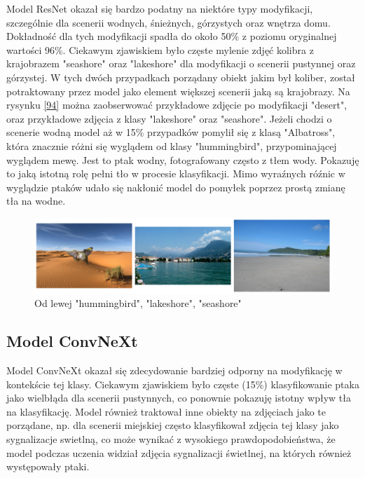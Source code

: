 Model ResNet okazał się bardzo podatny na niektóre typy modyfikacji, szczególnie dla scenerii wodnych, śnieżnych, górzystych oraz wnętrza domu. Dokładność dla tych modyfikacji spadła do około 50\% z poziomu oryginalnej wartości 96\%. Ciekawym zjawiskiem było częste mylenie zdjęć kolibra z krajobrazem "seashore" oraz
"lakeshore" dla modyfikacji o scenerii pustynnej oraz górzystej. W tych dwóch przypadkach porządany obiekt jakim był koliber, został potraktowany przez model jako element większej scenerii jaką są krajobrazy. Na rysynku \ref*{94} można zaobserwować przykładowe zdjęcie po modyfikacji "desert",
oraz przykładowe zdjęcia z klasy "lakeshore" oraz "seashore". Jeżeli chodzi o scenerie wodną model aż w 15\% przypadków pomylił się z klasą "Albatross", która znacznie różni się wyglądem od klasy "hummingbird", przypominającej wyglądem mewę. Jest to ptak wodny, fotografowany często z tłem wody.
Pokazuję to jaką istotną rolę pełni tło w procesie klasyfikacji. Mimo wyraźnych róźnic w wyglądzie ptaków udało się nakłonić model do pomyłek poprzez prostą zmianę tła na wodne.

\begin{figure}
	\centering\includegraphics[width=.9\textwidth]{img/94}
	\caption{Od lewej "hummingbird", "lakeshore", "seashore"}
	\label{rys:94}
\end{figure}

\subsection*{Model ConvNeXt}

Model ConvNeXt okazał się zdecydowanie bardziej odporny na modyfikację w kontekście tej klasy. Ciekawym zjawiskiem było częste (15\%) klasyfikowanie ptaka jako wielbłąda dla scenerii pustynnych, co ponownie pokazuję istotny wpływ tła na klasyfikację. Model również traktował inne obiekty 
na zdjęciach jako te porządane, np. dla scenerii miejskiej często klasyfikował zdjęcia tej klasy jako sygnalizacje swietlną, co może wynikać z wysokiego prawdopodobieństwa, że model podczas uczenia widział zdjęcia sygnalizacji świetlnej, na których również występowały ptaki. 

